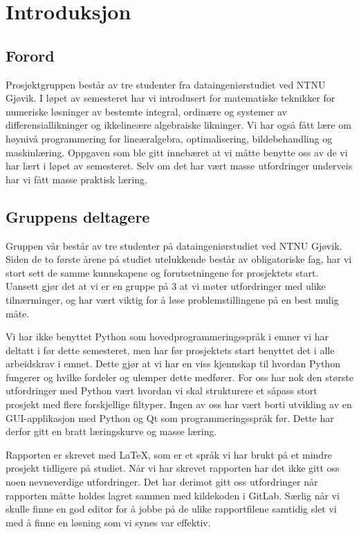 \section{Introduksjon}

\subsection{Forord}
Prosjektgruppen består av tre studenter fra dataingeniørstudiet ved NTNU Gjøvik. I løpet av 
semesteret har vi introdusert for matematiske teknikker for numeriske løsninger av bestemte 
integral, ordinære og systemer av differensiallikninger og ikkelineære algebraiske likninger. 
Vi har også fått lære om høynivå programmering for lineæralgebra, optimalisering, bildebehandling 
og maskinlæring. Oppgaven som ble gitt innebæret at vi måtte benytte oss av de vi har lært i løpet
av semesteret. Selv om det har vært masse utfordringer underveis har vi fått masse praktisk 
læring. 

\subsection{Gruppens deltagere}
Gruppen vår består av tre studenter på dataingeniørstudiet ved NTNU Gjøvik. Siden de to første årene på studiet utelukkende består av obligatoriske fag, har vi stort sett de samme kunnskapene og forutsetningene før prosjektets start. Uansett gjør det at vi er en gruppe på 3 at vi møter utfordringer med ulike tilnærminger, og har vært viktig for å løse problemstillingene på en best mulig måte.

Vi har ikke benyttet Python som hovedprogrammeringsspråk i emner vi har deltatt i før dette semesteret, men har før prosjektets start benyttet det i alle arbeidskrav i emnet. Dette gjør at vi har en viss kjennskap til hvordan Python fungerer og hvilke fordeler og ulemper dette medfører. For oss har nok den største utfordringer med Python vært hvordan vi skal strukturere et såpass stort prosjekt med flere forskjellige filtyper. Ingen av oss har vært borti utvikling av en GUI-applikasjon med Python og Qt som programmeringsspråk før. Dette har derfor gitt en bratt læringskurve og masse læring.

Rapporten er skrevet med LaTeX, som er et språk vi har brukt på et mindre prosjekt tidligere på studiet. Når vi har skrevet rapporten har det ikke gitt oss noen nevneverdige utfordringer. Det har derimot gitt oss utfordringer når rapporten måtte holdes lagret sammen med kildekoden i GitLab. Særlig når vi skulle finne en god editor for å jobbe på de ulike rapportfilene samtidig slet vi med å finne en løsning som vi synes var effektiv.

